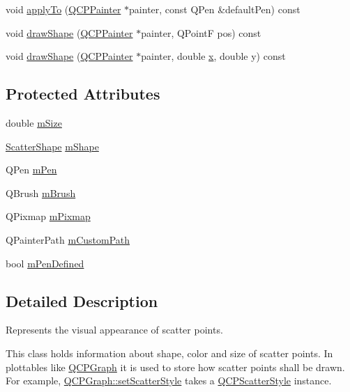 \begin{DoxyCompactItemize}
\item 
void \hyperlink{classQCPScatterStyle_a81817dfd404635f211e6ff2a04657d36}{apply\+To} (\hyperlink{classQCPPainter}{Q\+C\+P\+Painter} $\ast$painter, const Q\+Pen \&default\+Pen) const 
\item 
void \hyperlink{classQCPScatterStyle_a992d531ac471ec2b29bdec6aeb400a06}{draw\+Shape} (\hyperlink{classQCPPainter}{Q\+C\+P\+Painter} $\ast$painter, Q\+PointF pos) const 
\item 
void \hyperlink{classQCPScatterStyle_ae76811ac9f70ebf7a2b4c759853e6ed8}{draw\+Shape} (\hyperlink{classQCPPainter}{Q\+C\+P\+Painter} $\ast$painter, double \hyperlink{qualification__task_8cpp_a6150e0515f7202e2fb518f7206ed97dc}{x}, double y) const 
\end{DoxyCompactItemize}
\subsection*{Protected Attributes}
\begin{DoxyCompactItemize}
\item 
double \hyperlink{classQCPScatterStyle_a757da98671eb06b221979373ac2cec91}{m\+Size}
\item 
\hyperlink{classQCPScatterStyle_adb31525af6b680e6f1b7472e43859349}{Scatter\+Shape} \hyperlink{classQCPScatterStyle_af1b327f35f107ed108290187bbc8c7c6}{m\+Shape}
\item 
Q\+Pen \hyperlink{classQCPScatterStyle_a0f6a85e6d1e3ae1ca1b6efb4d4cdfe17}{m\+Pen}
\item 
Q\+Brush \hyperlink{classQCPScatterStyle_a1b9c6ab10aebcaf236f1f45d1d6d64d1}{m\+Brush}
\item 
Q\+Pixmap \hyperlink{classQCPScatterStyle_a7697346c89b19d4cd1d8dd33319ec9e3}{m\+Pixmap}
\item 
Q\+Painter\+Path \hyperlink{classQCPScatterStyle_a813cb074744dc5a2f59cc99d6a10c6f0}{m\+Custom\+Path}
\item 
bool \hyperlink{classQCPScatterStyle_a84ef5aa591ddba07b440f597e1669e78}{m\+Pen\+Defined}
\end{DoxyCompactItemize}


\subsection{Detailed Description}
Represents the visual appearance of scatter points. 

This class holds information about shape, color and size of scatter points. In plottables like \hyperlink{classQCPGraph}{Q\+C\+P\+Graph} it is used to store how scatter points shall be drawn. For example, \hyperlink{classQCPGraph_a12bd17a8ba21983163ec5d8f42a9fea5}{Q\+C\+P\+Graph\+::set\+Scatter\+Style} takes a \hyperlink{classQCPScatterStyle}{Q\+C\+P\+Scatter\+Style} instance.

